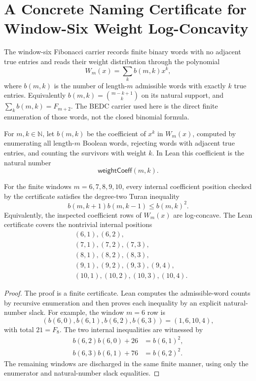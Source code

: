 \chapter{A Concrete Naming Certificate for Window-Six Weight Log-Concavity}
\label{ch:concrete-instances-window6-weight-logconcave-turan-namecert}

The window-six Fibonacci carrier records finite binary words with no adjacent true entries and reads their weight distribution through the polynomial
$$
W_m(x)=\sum_k b(m,k)x^k,
$$
where $b(m,k)$ is the number of length-$m$ admissible words with exactly $k$ true entries. Equivalently $b(m,k)=\binom{m-k+1}{k}$ on its natural support, and $\sum_k b(m,k)=F_{m+2}$. The BEDC carrier used here is the direct finite enumeration of those words, not the closed binomial formula.

\begin{definition}
\label{def:window6-fibonacci-weight-coefficient}
For $m,k\in\mathbb{N}$, let $b(m,k)$ be the coefficient of $x^k$ in $W_m(x)$, computed by enumerating all length-$m$ Boolean words, rejecting words with adjacent true entries, and counting the survivors with weight $k$. In Lean this coefficient is the natural number
$$
\mathsf{weightCoeff}(m,k).
$$
\end{definition}

\begin{theorem}
\label{thm:window6-weight-logconcave-turan}
For the finite windows $m=6,7,8,9,10$, every internal coefficient position checked by the certificate satisfies the degree-two Turan inequality
$$
b(m,k+1)b(m,k-1)\leq b(m,k)^2.
$$
Equivalently, the inspected coefficient rows of $W_m(x)$ are log-concave. The Lean certificate covers the nontrivial internal positions
$$
\begin{aligned}
&(6,1),(6,2),\\
&(7,1),(7,2),(7,3),\\
&(8,1),(8,2),(8,3),\\
&(9,1),(9,2),(9,3),(9,4),\\
&(10,1),(10,2),(10,3),(10,4).
\end{aligned}
$$
\end{theorem}

\begin{proof}
The proof is a finite certificate. Lean computes the admissible-word counts by recursive enumeration and then proves each inequality by an explicit natural-number slack. For example, the window $m=6$ row is
$$
(b(6,0),b(6,1),b(6,2),b(6,3))=(1,6,10,4),
$$
with total $21=F_8$. The two internal inequalities are witnessed by
$$
\begin{aligned}
b(6,2)b(6,0)+26&=b(6,1)^2,\\
b(6,3)b(6,1)+76&=b(6,2)^2.
\end{aligned}
$$
The remaining windows are discharged in the same finite manner, using only the enumerator and natural-number slack equalities.
\end{proof}

